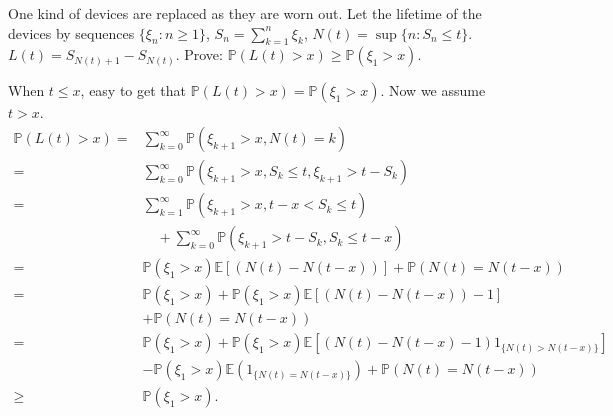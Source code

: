 \documentclass{ctexart}
\begin{document}
\begin{problem}\label{pro:4}
  One kind of devices are replaced as they are worn out. Let the lifetime of the devices by sequences
  \(\{\xi_n:n \geq 1\}\), \(S_n=\sum_{k=1}^{n} \xi_k\), \(N(t)=\sup \{n: S_n \leq t\}\). \(L(t)=S_{N(t) + 1}-S_{N(t)}\).
  Prove: \(\mathbb{P}(L(t)> x) \geq \mathbb{P}(\xi_1 > x)\).
\end{problem}
\begin{solution}
  When \(t \leq x\), easy to get that \(\mathbb{P}(L(t)>x)=\mathbb{P}(\xi_1>x)\).
  Now we assume \(t > x\).
  \begin{equation}
    \begin{aligned}
      \mathbb{P}(L(t)>x)= & \sum_{k=0}^{\infty} \mathbb{P}\left(\xi_{k+1}>x, N(t)=k\right)                                                           \\
      =                   & \sum_{k=0}^{\infty} \mathbb{P}\left(\xi_{k+1}>x, S_k \leq t, \xi_{k+1}>t-S_k\right)                                      \\
      =                   & \sum_{k=1}^{\infty} \mathbb{P}\left(\xi_{k+1}>x, t-x<S_k \leq t\right)                                                   \\
                          & \quad+\sum_{k=0}^{\infty} \mathbb{P}\left(\xi_{k+1}>t-S_k, S_k \leq t-x\right)                                           \\
      =                   & \mathbb{P}\left(\xi_1>x\right) \mathbb{E}[(N(t)-N(t-x))]+\mathbb{P}(N(t)=N(t-x))                                         \\
      =                   & \mathbb{P}\left(\xi_1>x\right)+\mathbb{P}\left(\xi_1>x\right) \mathbb{E}[(N(t)-N(t-x))-1]                                \\
                          & +\mathbb{P}(N(t)=N(t-x))                                                                                                 \\
      =                   & \mathbb{P}\left(\xi_1>x\right)+\mathbb{P}\left(\xi_1>x\right) \mathbb{E}\left[(N(t)-N(t-x)-1) 1_{\{N(t)>N(t-x)\}}\right] \\
                          & -\mathbb{P}\left(\xi_1>x\right) \mathbb{E}\left(1_{\{N(t)=N(t-x)\}}\right)+\mathbb{P}(N(t)=N(t-x))                       \\
      \geq                & \mathbb{P}\left(\xi_1>x\right) .
    \end{aligned}
  \end{equation}
\end{solution}
\end{document}
